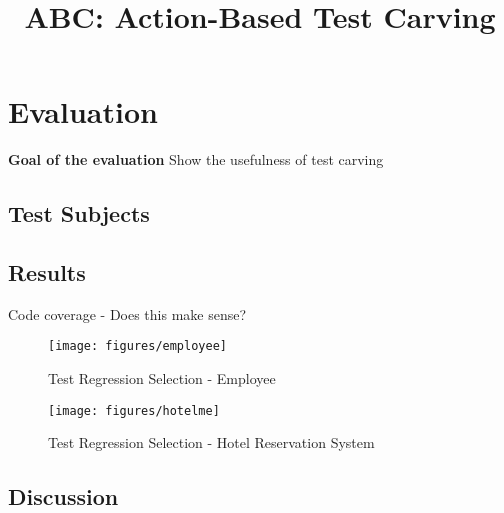 \documentclass[10pt,conference]{IEEEtran}
\title{ABC: Action-Based Test Carving}
\author{\IEEEauthorblockN{Alessio Gambi}
\IEEEauthorblockA{\textit{University of Passau} \\
Passau, Germany \\
alessio.gambi@uni-passau.de}%
}
\begin{document}
\maketitle

\begin{abstract}
\end{abstract}

\section{Evaluation}

\textbf{Goal of the evaluation} Show the usefulness of test carving

\subsection{Test Subjects}

\subsection{Results}
\begin{table*}
\caption{Code coverage - Does this make sense?}
\end{table*}

\begin{figure*}[t]
\centering
\begin{minipage}[b]{.45\textwidth}
\texttt{[image: figures/employee]}
\caption{Test Regression Selection - Employee}
\end{minipage}\hfill
\begin{minipage}[b]{.45\textwidth}
\texttt{[image: figures/hotelme]}
\caption{Test Regression Selection - Hotel Reservation System}
\end{minipage}
\end{figure*}



\subsection{Discussion}
\end{document}
